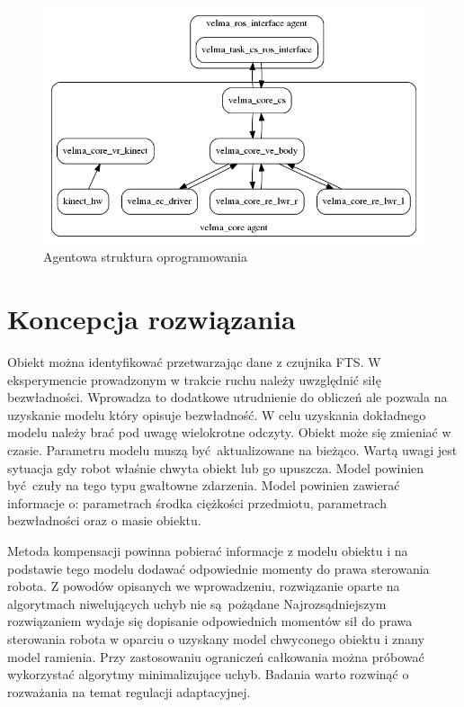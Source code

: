 \documentclass[12pt,a4paper]{article}
\begin{document}
	\begin{figure}[H]
		\centering
		\includegraphics[width=0.8\linewidth]{agenty}
		\caption{Agentowa struktura oprogramowania \cite{velma}}
		\label{fig:agenty}
	\end{figure}

	\section{Koncepcja rozwiązania}
	Obiekt można identyfikować przetwarzając dane z czujnika FTS. W eksperymencie prowadzonym w trakcie ruchu należy uwzględnić siłę bezwładności. Wprowadza to dodatkowe utrudnienie do obliczeń ale pozwala na uzyskanie modelu który opisuje bezwładność. W celu uzyskania dokładnego modelu należy brać pod uwagę wielokrotne odczyty. Obiekt może się zmieniać w czasie. Parametru modelu muszą być aktualizowane na bieżąco. Wartą uwagi jest sytuacja gdy robot właśnie chwyta obiekt lub go upuszcza. Model powinien być czuły na tego typu gwałtowne zdarzenia. Model powinien zawierać informacje o: parametrach środka ciężkości przedmiotu, parametrach bezwładności oraz o masie obiektu.

	Metoda kompensacji powinna pobierać informacje z modelu obiektu i na podstawie tego modelu dodawać odpowiednie momenty do prawa sterowania robota. Z powodów opisanych we wprowadzeniu, rozwiązanie oparte na algorytmach niwelujących uchyb nie są pożądane Najrozsądniejszym rozwiązaniem wydaje się dopisanie odpowiednich momentów sił do prawa sterowania robota w oparciu o uzyskany model chwyconego obiektu i znany model ramienia. Przy zastosowaniu ograniczeń całkowania można próbować wykorzystać algorytmy minimalizujące uchyb. Badania warto rozwinąć o rozważania na temat regulacji adaptacyjnej.
\end{document}
